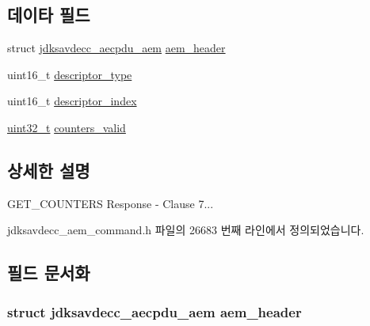 \subsection*{데이타 필드}
\begin{DoxyCompactItemize}
\item 
struct \hyperlink{structjdksavdecc__aecpdu__aem}{jdksavdecc\+\_\+aecpdu\+\_\+aem} \hyperlink{structjdksavdecc__aem__command__get__counters__response_ae1e77ccb75ff5021ad923221eab38294}{aem\+\_\+header}
\item 
uint16\+\_\+t \hyperlink{structjdksavdecc__aem__command__get__counters__response_ab7c32b6c7131c13d4ea3b7ee2f09b78d}{descriptor\+\_\+type}
\item 
uint16\+\_\+t \hyperlink{structjdksavdecc__aem__command__get__counters__response_a042bbc76d835b82d27c1932431ee38d4}{descriptor\+\_\+index}
\item 
\hyperlink{parse_8c_a6eb1e68cc391dd753bc8ce896dbb8315}{uint32\+\_\+t} \hyperlink{structjdksavdecc__aem__command__get__counters__response_a22bca41344f39625e05fe6ccf1a5f632}{counters\+\_\+valid}
\end{DoxyCompactItemize}


\subsection{상세한 설명}
G\+E\+T\+\_\+\+C\+O\+U\+N\+T\+E\+RS Response -\/ Clause 7... 

jdksavdecc\+\_\+aem\+\_\+command.\+h 파일의 26683 번째 라인에서 정의되었습니다.



\subsection{필드 문서화}
\subsubsection[{\texorpdfstring{aem\+\_\+header}{aem_header}}]{\setlength{\rightskip}{0pt plus 5cm}struct {\bf jdksavdecc\+\_\+aecpdu\+\_\+aem} aem\+\_\+header}\hypertarget{structjdksavdecc__aem__command__get__counters__response_ae1e77ccb75ff5021ad923221eab38294}{}\label{structjdksavdecc__aem__command__get__counters__response_ae1e77ccb75ff5021ad923221eab38294}


